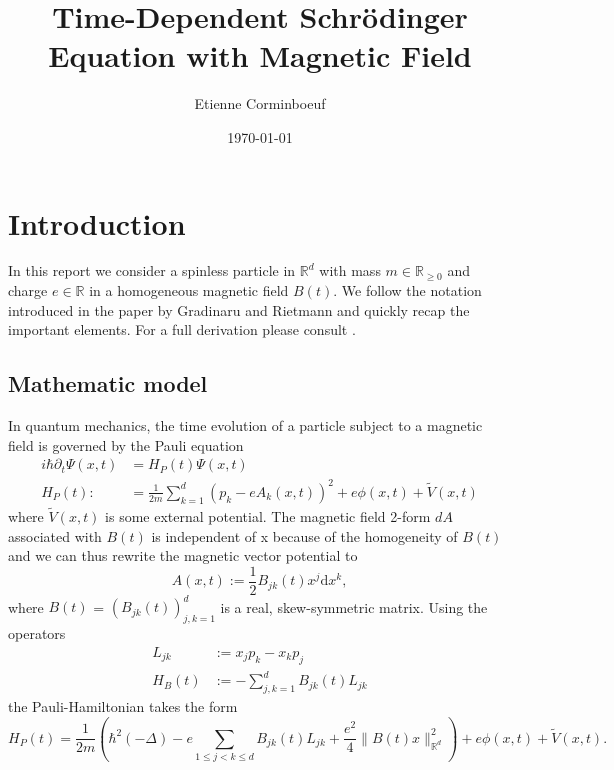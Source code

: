 \documentclass{article}
\title{Time-Dependent Schr{\"o}dinger Equation with Magnetic Field}
\author{Etienne Corminboeuf}
\date{\today}
\begin{document}
\maketitle

\tableofcontents

\section{Introduction} \label{sec:intro}
In this report we consider a spinless particle in $\mathbb{R}^d$ with mass $m \in \mathbb{R}_{\geq 0}$ and charge $e\in \mathbb{R}$ in a homogeneous magnetic field $B(t)$. We follow the notation introduced in the paper by Gradinaru and Rietmann and quickly recap the important elements. For a full derivation please consult \cite{paper_orvg}.
\subsection{Mathematic model}

In quantum mechanics, the time evolution of a particle subject to a magnetic field is governed by the Pauli equation
\begin{align} \label{eq_pauli}
  i \hbar \partial_t \Psi(x,t) &= H_P(t)\Psi(x,t) \\
  H_P(t) :&= \frac{1}{2m} \sum_{k=1}^d (p_k - e A_k(x,t))^2 + e\phi(x,t) + \tilde{V}(x,t)
\end{align}
where $\tilde{V}(x,t)$ is some external potential.
The magnetic field 2-form $dA$ associated with $B(t)$ is independent of x because of the homogeneity of $B(t)$ and we can thus rewrite the magnetic vector potential to
\begin{equation}
  A(x,t) := \frac{1}{2}B_{jk}(t)x^j \textrm{d}x^k,
\end{equation}
where $B(t)$ = $(B_{jk}(t))_{j,k = 1}^d$ is a real, skew-symmetric matrix. Using the operators
\begin{align}
  L_{jk} & := x_j p_k - x_k p_j \\
  H_B(t) & := - \sum_{j,k = 1}^d B_{jk}(t) L_{jk}
\end{align}
the Pauli-Hamiltonian takes the form
\begin{equation}
  H_P(t) = \frac{1}{2 m} \left(\hbar^{2}(-\Delta)-e \sum_{1 \leqslant j<k \leqslant d} B_{j k}(t) L_{j k} +\frac{e^{2}}{4}\|B(t) x\|_{\mathbb{R}^{d}}^{2}  \right) + e \phi(x,t) + \tilde{V}(x,t).
\end{equation}
\end{document}
